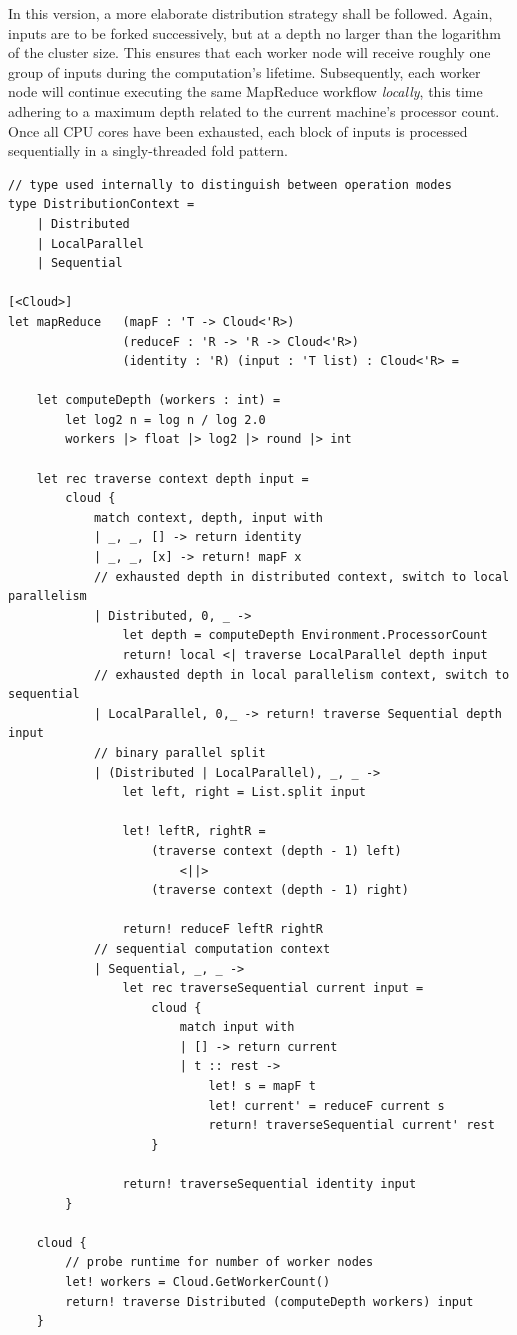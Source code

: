 \documentclass[9pt,a4paper]{article}
\begin{document}
In this version, a more elaborate distribution strategy shall be followed.
Again, inputs are to be forked successively, but at a depth no larger than the logarithm
of the cluster size. This ensures that each worker node will receive roughly one group
of inputs during the computation's lifetime. Subsequently, each worker node will continue
executing the same MapReduce workflow \emph{locally}, this time adhering to a maximum 
depth related to the current machine's processor count. Once all CPU cores have been
exhausted, each block of inputs is processed sequentially in a singly-threaded fold pattern.
\begin{lstlisting}
// type used internally to distinguish between operation modes
type DistributionContext =
    | Distributed
    | LocalParallel
    | Sequential

[<Cloud>]
let mapReduce   (mapF : 'T -> Cloud<'R>)
                (reduceF : 'R -> 'R -> Cloud<'R>)
                (identity : 'R) (input : 'T list) : Cloud<'R> =

    let computeDepth (workers : int) = 
        let log2 n = log n / log 2.0
        workers |> float |> log2 |> round |> int
 
    let rec traverse context depth input =
        cloud {
            match context, depth, input with
            | _, _, [] -> return identity
            | _, _, [x] -> return! mapF x
            // exhausted depth in distributed context, switch to local parallelism
            | Distributed, 0, _ ->
            	let depth = computeDepth Environment.ProcessorCount
                return! local <| traverse LocalParallel depth input
            // exhausted depth in local parallelism context, switch to sequential
            | LocalParallel, 0,_ -> return! traverse Sequential depth input
            // binary parallel split
            | (Distributed | LocalParallel), _, _ ->
                let left, right = List.split input

                let! leftR, rightR = 
                    (traverse context (depth - 1) left) 
                        <||> 
                    (traverse context (depth - 1) right)

                return! reduceF leftR rightR
            // sequential computation context
            | Sequential, _, _ ->
                let rec traverseSequential current input =
                    cloud {
                        match input with
                        | [] -> return current
                        | t :: rest ->
                            let! s = mapF t
                            let! current' = reduceF current s
                            return! traverseSequential current' rest
                    }

                return! traverseSequential identity input
        }

    cloud {
    	// probe runtime for number of worker nodes
        let! workers = Cloud.GetWorkerCount()
        return! traverse Distributed (computeDepth workers) input
    }
\end{lstlisting}
\end{document}
